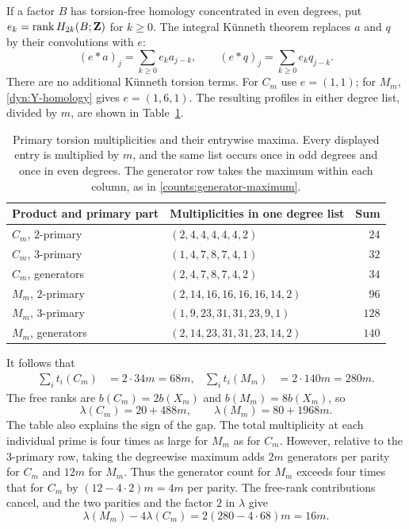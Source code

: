 If a factor $B$ has torsion-free homology concentrated in even degrees, put
$e_k=\operatorname{rank} H_{2k}(B;\mathbf Z)$ for $k\geq0$. The integral Künneth theorem replaces $a$ and $q$
by their convolutions with $e$:
\[
 (e*a)_j=\sum_{k\geq0}e_k a_{j-k},\qquad
 (e*q)_j=\sum_{k\geq0}e_k q_{j-k}.
\]
There are no additional Künneth torsion terms. For $C_m$ use $e=(1,1)$;
for $M_m$, \eqref{dyn:Y-homology} gives $e=(1,6,1)$. The resulting
profiles in either degree list, divided by $m$, are shown in
Table~\ref{tab:profiles}.

\begin{table}[tb]
\centering
\small
\begin{tabular}{@{}llr@{}}
\toprule
Product and primary part & Multiplicities in one degree list & Sum\\
\midrule
$C_m$, $2$-primary & $(2,4,4,4,4,4,2)$ & $24$\\
$C_m$, $3$-primary & $(1,4,7,8,7,4,1)$ & $32$\\
$C_m$, generators & $(2,4,7,8,7,4,2)$ & $34$\\
\midrule
$M_m$, $2$-primary & $(2,14,16,16,16,16,14,2)$ & $96$\\
$M_m$, $3$-primary & $(1,9,23,31,31,23,9,1)$ & $128$\\
$M_m$, generators & $(2,14,23,31,31,23,14,2)$ & $140$\\
\bottomrule
\end{tabular}
\caption{Primary torsion multiplicities and their entrywise maxima.
Every displayed entry is multiplied by $m$, and the same list occurs
once in odd degrees and once in even degrees. The generator row takes
the maximum within each column, as in
\eqref{counts:generator-maximum}.}
\label{tab:profiles}
\end{table}

It follows that
\begin{align}
 \sum_i t_i(C_m)&=2\cdot34m=68m,&
 \sum_i t_i(M_m)&=2\cdot140m=280m.\label{counts:torsion-totals}
\end{align}
The free ranks are $b(C_m)=2b(X_m)$ and $b(M_m)=8b(X_m)$, so
\begin{equation}\label{counts:lambda}
 \lambda(C_m)=20+488m,\qquad
 \lambda(M_m)=80+1968m.
\end{equation}
The table also explains the sign of the gap. The total multiplicity at
each individual prime is four times as large for $M_m$ as for $C_m$.
However, relative to the $3$-primary row, taking the degreewise maximum
adds $2m$ generators per parity for $C_m$ and $12m$ for $M_m$. Thus the
generator count for $M_m$ exceeds four times that for $C_m$ by
$(12-4\cdot2)m=4m$ per parity. The free-rank contributions cancel,
and the two parities and the factor $2$ in $\lambda$ give
\begin{equation}\label{counts:gap}
 \lambda(M_m)-4\lambda(C_m)
 =2(280-4\cdot68)m=16m.
\end{equation}

